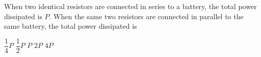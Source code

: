 \begin{questions}\setcounter{question}{20}\question
When two identical resistors are connected in series to a battery, the total power dissipated is $P$. When the same two resistors are connected in parallel to the same battery, the total power dissipated is

\begin{oneparchoices}
\choice $\dfrac{1}{4}P$
\choice $\dfrac{1}{2}P$
\choice $P$
\choice $2P$
\choice $4P$
\end{oneparchoices}\end{questions}

